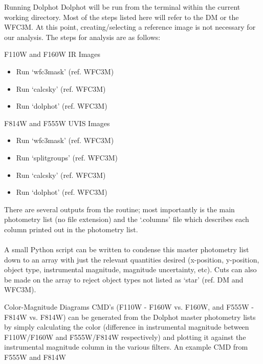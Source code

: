\documentclass[12pt]{article}
\begin{document}
\begin{section}{Running Dolphot}
Dolphot will be run from the terminal within the current working directory. Most of the steps listed here will refer to the DM or the WFC3M. At this point, creating/selecting a reference image is not necessary for our analysis. The steps for analysis are as follows: \\
\begin{subsection}{F110W and F160W IR Images}
\begin{itemize}
\item Run `wfc3mask' (ref. WFC3M)
\item Run `calcsky' (ref. WFC3M)
\item Run `dolphot' (ref. WFC3M)
\end{itemize}
\end{subsection}

\begin{subsection}{F814W and F555W UVIS Images}
\begin{itemize}
\item Run `wfc3mask' (ref. WFC3M)
\item Run `splitgroups' (ref. WFC3M)
\item Run `calcsky' (ref. WFC3M)
\item Run `dolphot' (ref. WFC3M)
\end{itemize}
\end{subsection}
There are several outputs from the routine; most importantly is the main photometry list (no file extension) and the `.columns' file which describes each column printed out in the photometry list. \\
\\
A small Python script can be written to condense this master photometry list down to an array with just the relevant quantities desired (x-position, y-position, object type, instrumental magnitude, magnitude uncertainty, etc). Cuts can also be made on the array to reject object types not listed as `star' (ref. DM and WFC3M).

\end{section}

\begin{section}{Color-Magnitude Diagrams}
CMD's (F110W - F160W vs. F160W, and F555W - F814W vs. F814W) can be generated from the Dolphot master photometry lists by simply calculating the color (difference in instrumental magnitude between F110W/F160W and F555W/F814W respectively) and plotting it against the instrumental magnitude column in the various filters. An example CMD from F555W and F814W 

\end{section}




 
\end{document}
